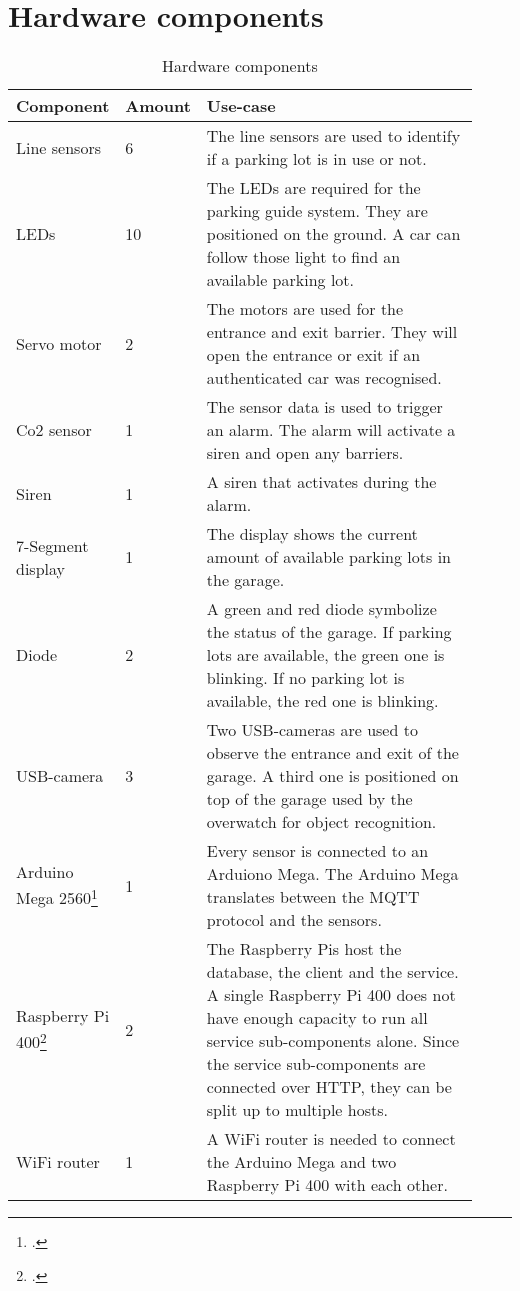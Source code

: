 \section{Hardware components}
\begin{table}[H]
    \begin{tabular}{p{0.22\linewidth} p{0.1\linewidth} p{0.6\linewidth}}
        \rowcolor{TableHeaderClr}
        \hline
        \textbf{Component} & \textbf{Amount} & \textbf{Use-case}\\
        \hline
        Line sensors & 6 & The line sensors are used to identify if a parking lot is in use or not.\\
        LEDs & 10 & The LEDs are required for the parking guide system. They are positioned on the ground. A car can follow those light to find an available parking lot.\\
        Servo motor & 2 & The motors are used for the entrance and exit barrier. They will open the entrance or exit if an authenticated car was recognised.\\
        Co2 sensor & 1 & The sensor data is used to trigger an alarm. The alarm will activate a siren and open any barriers.\\
        Siren & 1 & A siren that activates during the alarm.\\
        7-Segment display & 1 & The display shows the current amount of available parking lots in the garage.\\
        Diode & 2 & A green and red diode symbolize the status of the garage. If parking lots are available, the green one is blinking. If no parking lot is available, the red one is blinking.\\
        USB-camera & 3 & Two USB-cameras are used to observe the entrance and exit of the garage. A third one is positioned on top of the garage used by the overwatch for object recognition.\\
        Arduino Mega 2560\footcite[][]{arduinoMega} & 1 & Every sensor is connected to an Arduiono Mega. The Arduino Mega translates between the MQTT protocol and the sensors.\\
        Raspberry Pi 400\footcite[][]{raspberryPi400} & 2 & The Raspberry Pis host the database, the client and the service. A single Raspberry Pi 400 does not have enough capacity to run all service sub-components alone. Since the service sub-components are connected over HTTP, they can be split up to multiple hosts. \\
        WiFi router & 1 & A WiFi router is needed to connect the Arduino Mega and two Raspberry Pi 400 with each other.\\
        \hline
        \end{tabular}
    \caption{Hardware components}
    \label{tab:Hardware components}
\end{table}


